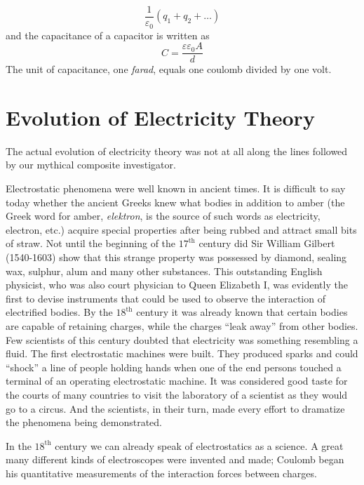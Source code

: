 \begin{equation*}%
\frac{1}{\varepsilon_{0}}(q_{1} + q_{2} + \ldots)
\end{equation*}
and the capacitance of a capacitor is written as
\begin{equation*}%
C = \frac{\varepsilon\varepsilon_{0}A}{d}
\end{equation*}
The unit of capacitance, one \emph{farad}, equals one coulomb divided by one volt.

\section{Evolution of Electricity Theory}
The actual evolution of electricity theory was not at all along the lines followed by our mythical composite investigator.

Electrostatic phenomena were well known in ancient times. It is difficult to say today whether the ancient Greeks knew what bodies in addition to amber (the Greek word for amber, \emph{elektron}, is the source of such words as electricity, electron, etc.) acquire special properties after being rubbed and attract small bits of straw. Not until the beginning of the $17^{\textrm{th}}$ century did Sir William Gilbert (1540-1603) show that this strange property was possessed by diamond, sealing wax, sulphur, alum and many other substances. This outstanding English physicist, who was also court physician to Queen Elizabeth I, was evidently the first to devise instruments that could be used to observe the interaction of electrified bodies. By the $18^{\textrm{th}}$ century it was already known that certain bodies are capable of retaining charges, while the charges ``leak away'' from other bodies. Few scientists of this century doubted that electricity was something resembling a fluid. The first electrostatic machines were built. They produced sparks and could ``shock'' a line of people holding hands when one of the end persons touched a terminal of an operating electrostatic machine. It was considered good taste for the courts of many countries to visit the laboratory of a scientist as they would go to a circus. And the scientists, in their turn, made every effort to dramatize the phenomena being demonstrated.

In the $18^{\textrm{th}}$ century we can already speak of electrostatics as a science. A great many different kinds of electroscopes were invented and made; Coulomb began his quantitative measurements of the interaction forces between charges.

